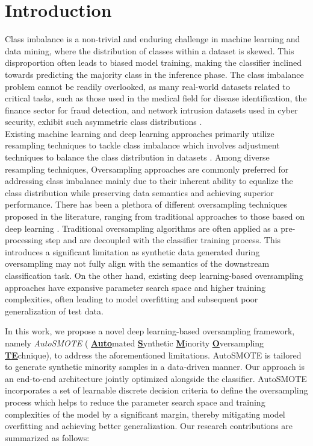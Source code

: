 \section{Introduction} \label{sec:intro}

Class imbalance is a non-trivial and enduring challenge in machine learning and data mining, where the distribution of classes within a dataset is skewed. This disproportion often leads to biased model training, making the classifier inclined towards predicting the majority class in the inference phase\cite{guo2008class,johnson2019survey}. The class imbalance problem cannot be readily overlooked, as many real-world datasets related to critical tasks, such as those used in the medical field for disease identification, the finance sector for fraud detection, and network intrusion datasets used in cyber security, exhibit such asymmetric class distributions \cite{cieslak2006combating,japkowicz2002class,al2021financial}.
\\
Existing machine learning and deep learning approaches primarily utilize resampling techniques to tackle class imbalance which involves adjustment techniques to balance the class distribution in datasets \cite{khushi2021comparative,marques2013suitability}. Among diverse resampling techniques, Oversampling approaches are commonly preferred for addressing class imbalance mainly due to their inherent ability to equalize the class distribution while preserving data semantics and achieving superior performance. There has been a plethora of different oversampling techniques proposed in the literature, ranging from traditional approaches \cite{chawla2002smote,tang2008svms,han2005borderline,he2008adasyn,douzas2018improving} to those based on deep learning \cite{ando2017deep,dablain2022deepsmote,karunasingha2023oc}. Traditional oversampling algorithms are often applied as a pre-processing step and are decoupled with the classifier training process. This introduces a significant limitation as synthetic data generated during oversampling may not fully align with the semantics of the downstream classification task. On the other hand, existing deep learning-based oversampling approaches have expansive parameter search space and higher training complexities, often leading to model overfitting and subsequent poor generalization of test data.

In this work,  we propose a novel deep learning-based oversampling framework, namely \emph{AutoSMOTE} ( \textbf{\underline{Auto}}mated \textbf{\underline{S}}ynthetic \textbf{\underline{M}}inority \textbf{\underline{O}}versampling \textbf{\underline{TE}}chnique), to address the aforementioned limitations. AutoSMOTE is tailored to generate synthetic minority samples in a data-driven manner. Our approach is an end-to-end architecture jointly optimized alongside the classifier. AutoSMOTE incorporates a set of learnable discrete decision criteria to define the oversampling process which helps to reduce the parameter search space and training complexities of the model by a significant margin, thereby mitigating model overfitting and achieving better generalization. Our research contributions are summarized as follows:

